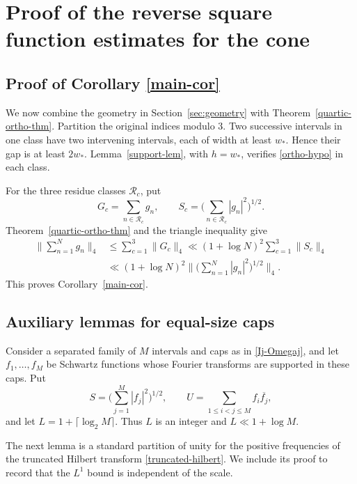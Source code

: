 \documentclass{amsart}
\numberwithin{equation}{section}
\begin{document}
\bigskip 

\section{Proof of the reverse square function estimates for the cone}
\label{sec:cone-estimates}

\subsection{Proof of Corollary \ref{main-cor}}
\label{sec:finish}

We now combine the geometry in Section~\ref{sec:geometry} with Theorem~\ref{quartic-ortho-thm}. 
Partition the original indices modulo $3$. 
Two successive intervals in one class have two intervening intervals, each of width at least $w_*$.
Hence their gap is at least $2w_*$. 
Lemma~\ref{support-lem}, with $h=w_*$, verifies
\eqref{ortho-hypo} in each class.

For the three residue classes $\mathcal R_c$, put
\[
    G_c=\sum_{n\in\mathcal R_c}g_n,
    \qquad
    S_c=\Big(\sum_{n\in\mathcal R_c}|g_n|^2\Big)^{1/2}.
\]
Theorem~\ref{quartic-ortho-thm} and the triangle inequality give
\begin{align*}
    \Big\|\sum_{n=1}^N g_n\Big\|_4
    &\leq\sum_{c=1}^3\|G_c\|_4
      \ll(1+\log N)^2\sum_{c=1}^3\|S_c\|_4\\
    &\ll(1+\log N)^2
      \Big\|\Big(\sum_{n=1}^N|g_n|^2\Big)^{1/2}\Big\|_4.
\end{align*}
This proves Corollary~\ref{main-cor}.

\medskip 

\subsection{Auxiliary lemmas for equal-size caps}
\label{sec:cone-auxiliary}

Consider a separated family of $M$ intervals and caps as in \eqref{Ij-Omegaj}, and let $f_1,\ldots,f_M$ be Schwartz functions whose Fourier transforms are supported in these caps. 
Put
\[
    S=\Big(\sum_{j=1}^M|f_j|^2\Big)^{1/2},
    \qquad
    U=\sum_{1\leq i<j\leq M}f_i\overline{f_j},
\]
and let $L=1+\lceil\log_2 M\rceil$. 
Thus $L$ is an integer and $L\ll1+\log M$.

The next lemma is a standard partition of unity for the positive frequencies of the truncated Hilbert transform \eqref{truncated-hilbert}.
We include its proof to record that the $L^1$ bound is independent of the scale.
\end{document}
